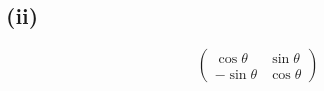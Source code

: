 \subsection*{(ii)}
\[
\begin{pmatrix}
\cos\theta & \sin\theta\\
-\sin\theta & \cos\theta
\end{pmatrix}
\]

